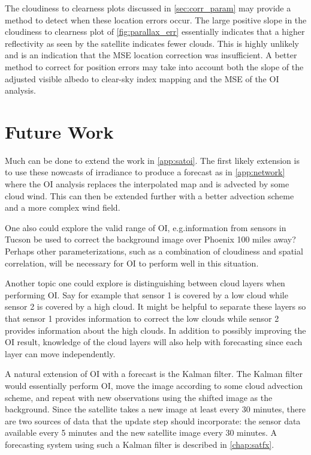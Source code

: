 The cloudiness to clearness plots discussed in \cref{sec:corr_param}
may provide a method to detect when these location errors occur.
The large positive slope in the cloudiness to clearness plot of
\cref{fig:parallax_err} essentially indicates that a higher
reflectivity as seen by the satellite indicates fewer clouds.
This is highly unlikely and is an indication that the MSE location
correction was insufficient.
A better method to correct for position errors may take into account
both the slope of the adjusted visible albedo to clear-sky index
mapping and the MSE of the OI analysis.

\section{Future Work}
Much can be done to extend the work in \cref{app:satoi}.
The first likely extension is to use these nowcasts of irradiance to
produce a forecast as in \cref{app:network} where the OI analysis
replaces the interpolated map and is advected by some cloud wind.
This can then be extended further with a better advection scheme and
a more complex wind field.

One also could explore the valid range of OI, e.g.\@can information
from sensors in Tucson be used to correct the background image over
Phoenix 100 miles away?
Perhaps other parameterizations, such as a combination of cloudiness
and spatial correlation, will be necessary for OI to perform well in
this situation.

Another topic one could explore is distinguishing between cloud layers
when performing OI.
Say for example that sensor 1 is covered by a low cloud while sensor 2
is covered by a high cloud.
It might be helpful to separate these layers so that sensor 1 provides
information to correct the low clouds while sensor 2 provides
information about the high clouds.
In addition to possibly improving the OI result, knowledge of the
cloud layers will also help with forecasting since each layer can move
independently.

A natural extension of OI with a forecast is the Kalman filter.
The Kalman filter would essentially perform OI, move the image
according to some cloud advection scheme, and repeat with new
observations using the shifted image as the background.
Since the satellite takes a new image at least every 30 minutes, there
are two sources of data that the update step should incorporate: the
sensor data available every 5 minutes and the new satellite image
every 30 minutes.
A forecasting system using such a Kalman filter is described in
\cref{chap:satfx}.

